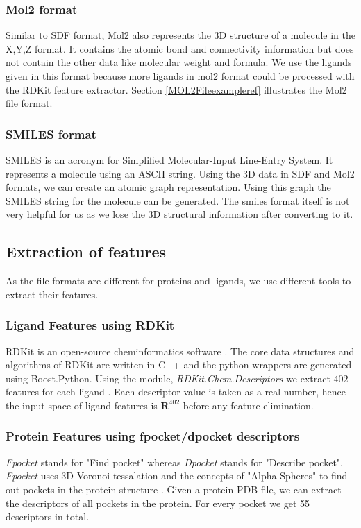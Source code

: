 \documentclass[11pt]{article}
\begin{document}
\subsubsection{Mol2 format}
Similar to SDF format,  Mol2 also represents the 3D structure of a molecule in the X,Y,Z format.
It contains the atomic bond and connectivity information but does not contain the other data like molecular weight and formula.
We use the ligands given in this format because more ligands in mol2 format could be processed with the RDKit feature extractor.
Section \ref{MOL2Fileexampleref} illustrates the Mol2 file format.

\subsubsection{SMILES format}
SMILES is an acronym for Simplified Molecular-Input Line-Entry System.
It represents a molecule using an ASCII string.
Using the 3D data in SDF and Mol2 formats,  we can create an atomic graph representation.
Using this graph the SMILES string for the molecule can be generated.
The smiles format itself is not very helpful for us as we lose the 3D structural information after converting to it.
\cite{smilesformat}

\subsection{Extraction of features}
As the file formats are different for proteins and ligands,  we use different tools to extract their features.
\subsubsection{Ligand Features using RDKit}
RDKit is an open-source cheminformatics software \cite{rdkitofficalpage}.
The core data structures and algorithms of RDKit are written in C++ and the
python wrappers are generated using Boost.Python.
Using the module, \textit{RDKit.Chem.Descriptors} we extract $402$ features for each ligand \cite{rdkitbioinformaticsfreiburg}.
Each descriptor value is taken as a real number,  hence the input space of ligand features is $\mathbf{R}^{402}$ before any feature elimination.

\subsubsection{Protein Features using fpocket/dpocket descriptors}
\textit{Fpocket} stands for "Find pocket" whereas \textit{Dpocket} stands for "Describe pocket".
\textit{Fpocket} uses 3D Voronoi tessalation and the concepts of "Alpha Spheres" to find out pockets in the protein structure \cite{fpocketmanual} \cite{voronoitesselationshortvideo}.
Given a protein PDB file, we can extract the descriptors of all pockets in the protein.
For every pocket we get 55 descriptors in total.
\end{document}
